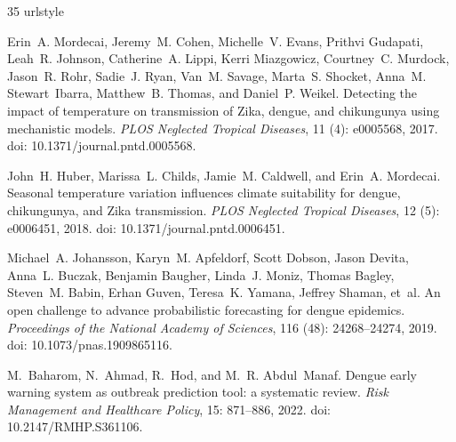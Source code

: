 \documentclass[11pt,a4paper]{article}
\begin{document}
\begin{thebibliography}{35}
\providecommand{\natexlab}[1]{#1}
\providecommand{\url}[1]{\texttt{#1}}
\expandafter\ifx\csname urlstyle\endcsname\relax
  \providecommand{\doi}[1]{doi: #1}\else
  \providecommand{\doi}{doi: \begingroup \urlstyle{rm}\Url}\fi

Erin~A. Mordecai, Jeremy~M. Cohen, Michelle~V. Evans, Prithvi Gudapati, Leah~R.
  Johnson, Catherine~A. Lippi, Kerri Miazgowicz, Courtney~C. Murdock, Jason~R.
  Rohr, Sadie~J. Ryan, Van~M. Savage, Marta~S. Shocket, Anna~M. Stewart~Ibarra,
  Matthew~B. Thomas, and Daniel~P. Weikel.
\newblock Detecting the impact of temperature on transmission of {Zika},
  dengue, and chikungunya using mechanistic models.
\newblock \emph{PLOS Neglected Tropical Diseases}, 11 (4):
  e0005568, 2017.
\newblock \doi{10.1371/journal.pntd.0005568}.

John~H. Huber, Marissa~L. Childs, Jamie~M. Caldwell, and Erin~A. Mordecai.
\newblock Seasonal temperature variation influences climate suitability for
  dengue, chikungunya, and {Zika} transmission.
\newblock \emph{PLOS Neglected Tropical Diseases}, 12 (5):
  e0006451, 2018.
\newblock \doi{10.1371/journal.pntd.0006451}.

Michael~A. Johansson, Karyn~M. Apfeldorf, Scott Dobson, Jason Devita, Anna~L.
  Buczak, Benjamin Baugher, Linda~J. Moniz, Thomas Bagley, Steven~M. Babin,
  Erhan Guven, Teresa~K. Yamana, Jeffrey Shaman, et~al.
\newblock An open challenge to advance probabilistic forecasting for dengue
  epidemics.
\newblock \emph{Proceedings of the National Academy of Sciences}, 116
  (48): 24268--24274, 2019.
\newblock \doi{10.1073/pnas.1909865116}.

M.~Baharom, N.~Ahmad, R.~Hod, and M.~R. Abdul~Manaf.
\newblock Dengue early warning system as outbreak prediction tool: a systematic
  review.
\newblock \emph{Risk Management and Healthcare Policy}, 15: 871--886,
  2022.
\newblock \doi{10.2147/RMHP.S361106}.


\end{thebibliography}
\end{document}
